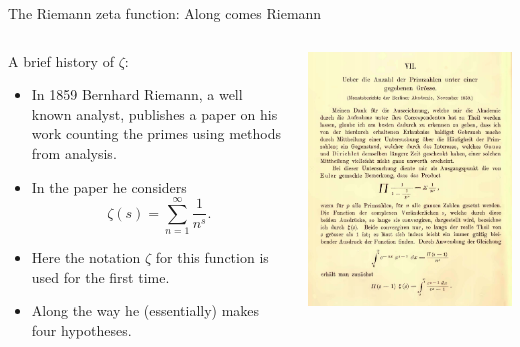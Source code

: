 \documentclass{beamer}
\begin{document}
\begin{frame}{The Riemann zeta function: Along comes Riemann}
\begin{columns}
\begin{column}{.575\textwidth}
A brief history of $\zeta$:
\begin{itemize}
\item In 1859 Bernhard Riemann, a well known analyst, publishes a paper on his work counting the primes using methods from analysis.
\item<2-> In the paper he considers
\[
\zeta(s) = \sum_{n=1}^{\infty} \frac{1}{n^s}.
\]
\item<3-> Here the notation $\zeta$ for this function is used for the first time.
\item<4-> Along the way he (essentially) makes four hypotheses.
\end{itemize}
\end{column}
\begin{column}{.425\textwidth}
\includegraphics[width=\textwidth]{img/ueber}
\end{column}
\end{columns}
\end{frame}
\end{document}
